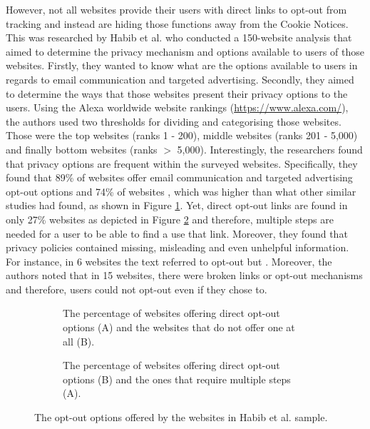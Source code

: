 \documentclass[../main.tex]{subfiles}
\begin{document}
However, not all websites provide their users with direct links to opt-out from tracking and instead are hiding those functions away from the Cookie Notices. This was researched by Habib et al. \cite{habib2019empirical} who conducted a 150-website analysis that aimed to determine the privacy mechanism and options available to users of those websites. Firstly, they wanted to know what are the options available to users in regards to email communication and targeted advertising. Secondly, they aimed to determine the ways that those websites present their privacy options to the users. Using the Alexa worldwide website rankings (\url{https://www.alexa.com/}), the authors used two thresholds for dividing and categorising those websites. Those were the top websites (ranks 1 - 200), middle websites (ranks 201 - 5,000) and finally bottom websites (ranks $>$ 5,000). Interestingly, the researchers found that privacy options are frequent within the surveyed websites. Specifically, they found that 89\% of websites offer email communication and targeted advertising opt-out options and 74\% of websites , which was higher than what other similar studies had found, as shown in Figure \ref{fig:habib_a}. Yet, direct opt-out links are found in only 27\% websites as depicted in Figure \ref{fig:habib_b} and therefore, multiple steps are needed for a user to be able to find a use that link. Moreover, they found that privacy policies contained missing, misleading and even unhelpful information. For instance, in 6 websites the text referred to opt-out but . Moreover, the authors noted that in 15 websites, there were broken links or opt-out mechanisms and therefore, users could not opt-out even if they chose to.

\begin{figure}[ht]
    \centering
    \begin{subfigure}[b]{0.45\textwidth}
        \centering
        \caption{The percentage of websites offering direct opt-out options (A) and the websites that do not offer one at all (B).}
        \label{fig:habib_a}
    \end{subfigure}
    \hfill
    \begin{subfigure}[b]{0.45\textwidth}
        \centering
        \caption{The percentage of websites offering direct opt-out options (B) and the ones that require multiple steps (A).}
        \label{fig:habib_b}
    \end{subfigure}
    \caption{The opt-out options offered by the websites in Habib et al. sample.}
    \label{fig:habib}
\end{figure}
\end{document}
